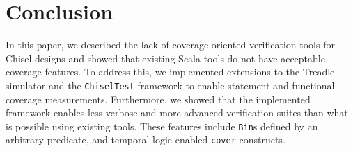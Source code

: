 \documentclass[a4paper]{IEEEtran}
\newcommand{\andrew}[1]{{\color{red} Andrew: #1}}
\newcommand{\hjd}[1]{{\color{pink} Hans: #1}}
\begin{document}
\section{Conclusion}

In this paper, we described the lack of coverage-oriented verification tools 
for Chisel designs and showed that existing Scala tools do not have acceptable coverage features. To 
address this, we implemented extensions to the Treadle simulator and the \texttt{ChiselTest} framework 
to enable statement and functional coverage measurements. Furthermore, we showed that the implemented 
framework enables less verbose and more advanced verification suites than what is possible using existing tools. 
These features include \texttt{Bin}s defined by an arbitrary predicate, and temporal logic enabled \texttt{cover} constructs. 
\end{document}
